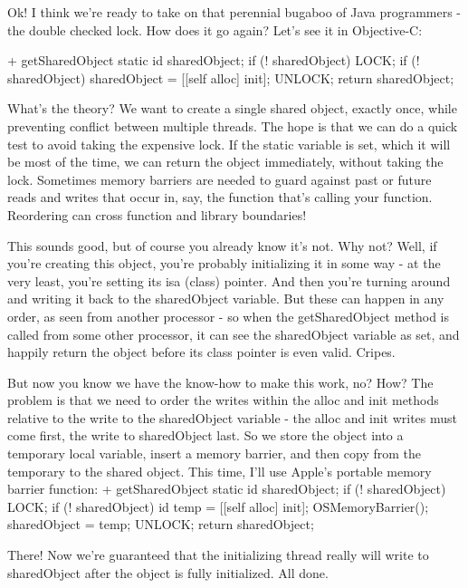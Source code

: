{{{{Ok! I think we're ready to take on that perennial bugaboo of Java programmers - the double checked lock. How does it go again? Let's see it in Objective-C:

+ getSharedObject {
    static id sharedObject;
    if (! sharedObject) {
        LOCK;
        if (! sharedObject) {
            sharedObject = [[self alloc] init];
        }
        UNLOCK;
    }
    return sharedObject;
}

What's the theory? We want to create a single shared object, exactly once, while preventing conflict between multiple threads. The hope is that we can do a quick test to avoid taking the expensive lock. If the static variable is set, which it will be most of the time, we can return the object immediately, without taking the lock. 
Sometimes memory barriers are needed to guard against past or future reads and writes that occur in, say, the function that's calling your function. Reordering can cross function and library boundaries!

This sounds good, but of course you already know it's not. Why not? Well, if you're creating this object, you're probably initializing it in some way - at the very least, you're setting its isa (class) pointer. And then you're turning around and writing it back to the sharedObject variable. But these can happen in any order, as seen from another processor - so when the getSharedObject method is called from some other processor, it can see the sharedObject variable as set, and happily return the object before its class pointer is even valid. Cripes.

But now you know we have the know-how to make this work, no? How? The problem is that we need to order the writes within the alloc and init methods relative to the write to the sharedObject variable - the alloc and init writes must come first, the write to sharedObject last. So we store the object into a temporary local variable, insert a memory barrier, and then copy from the temporary to the shared object. This time, I'll use Apple's portable memory barrier function: 
+ getSharedObject {
    static id sharedObject;
    if (! sharedObject) {
        LOCK;
        if (! sharedObject) {
            id temp = [[self alloc] init];
            OSMemoryBarrier();
            sharedObject = temp;
        }
        UNLOCK;
    }
    return sharedObject;
}

There! Now we're guaranteed that the initializing thread really will write to sharedObject after the object is fully initialized. All done.

}}}}
